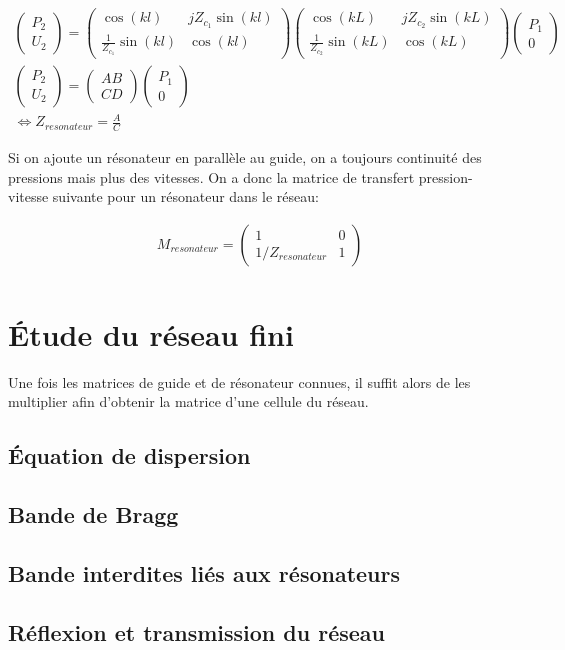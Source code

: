 \begin{eqnarray*}
\begin{pmatrix} P_2 \\U_2 \end{pmatrix} = \begin{pmatrix} \cos(k l) & j Z_{c_1} \sin(k l) \\ \frac{1}{Z_{c_1}} \sin(k l) & \cos(k l) \end{pmatrix} \begin{pmatrix} \cos(k L) & j Z_{c_2} \sin(k L) \\ \frac{1}{Z_{c_2}} \sin(k L) & \cos(k L) \end{pmatrix} \begin{pmatrix} P_1 \\ 0  \end{pmatrix} \\
\begin{pmatrix} P_2 \\U_2 \end{pmatrix} = \begin{pmatrix} A B \\ C D \end{pmatrix} \begin{pmatrix} P_1 \\ 0  \end{pmatrix} \\
\Leftrightarrow Z_{resonateur} = \frac{A}{C}
\end{eqnarray*}


Si on ajoute un résonateur en parallèle au guide, on a toujours continuité des pressions mais plus des vitesses. On a donc la matrice de transfert pression-vitesse suivante pour un résonateur dans le réseau:

\begin{eqnarray*}
M_{resonateur} = \begin{pmatrix} 1 &  0 \\ 1 /Z_{resonateur} & 1  \end{pmatrix}\\
\end{eqnarray*}

\section{Étude du réseau fini}

Une fois les matrices de guide et de résonateur connues, il suffit alors de les multiplier afin d'obtenir la matrice d'une cellule du réseau.

\subsection{Équation de dispersion}
\subsection{Bande de Bragg}
\subsection{Bande interdites liés aux résonateurs}
\subsection{Réflexion et transmission du réseau}
